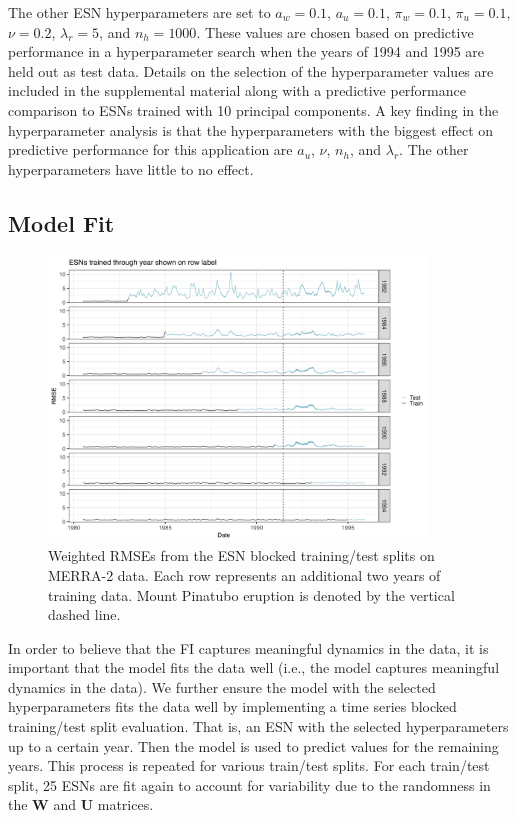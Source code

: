 \documentclass[AMS,STIX2COL]{WileyNJD-v2}
\begin{document}
The other ESN hyperparameters are set to $a_w=0.1$, $a_u=0.1$, $\pi_w=0.1$, $\pi_u=0.1$, $\nu=0.2$, $\lambda_r=5$, and $n_h=1000$. These values are chosen based on predictive performance in a hyperparameter search when the years of 1994 and 1995 are held out as test data. Details on the selection of the hyperparameter values are included in the supplemental material along with a predictive performance comparison to ESNs trained with 10 principal components. A key finding in the hyperparameter analysis is that the hyperparameters with the biggest effect on predictive performance for this application are $a_u$, $\nu$, $n_h$, and $\lambda_r$. The other hyperparameters have little to no effect.

\subsection{Model Fit}

\begin{figure}[ht!]
    \centering
    \includegraphics[width=0.9\textwidth]{figures/merra2_rmse_anom_even_yrs.png}
    \caption{Weighted RMSEs from the ESN blocked training/test splits on MERRA-2 data. Each row represents an additional two years of training data. Mount Pinatubo eruption is denoted by the vertical dashed line.}
    \label{fig:merra2rmse_even}
\end{figure}

In order to believe that the FI captures meaningful dynamics in the data, it is important that the model fits the data well (i.e., the model captures meaningful dynamics in the data). We further ensure the model with the selected hyperparameters fits the data well by implementing a time series blocked training/test split evaluation. That is, an ESN with the selected hyperparameters up to a certain year. Then the model is used to predict values for the remaining years. This process is repeated for various train/test splits. For each train/test split, 25 ESNs are fit again to account for variability due to the randomness in the \textbf{W} and \textbf{U} matrices.
\end{document}

